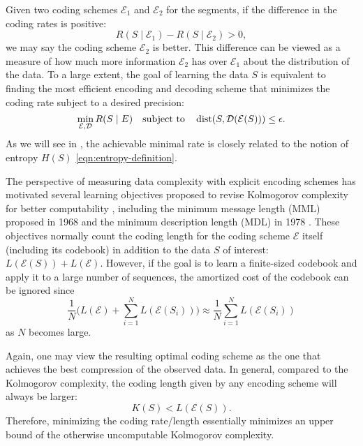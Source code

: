 \documentclass[../../book-main.tex]{subfiles}
\begin{document}
Given two coding schemes $\mathcal{E}_1$ and $\mathcal{E}_2$ for the segments, if the difference in the coding rates is positive:
\begin{equation}
   R(S \mid \mathcal E_1) -  R(S \mid \mathcal E_2) > 0, 
\end{equation}
we may say the coding scheme $\mathcal{E}_2$ is better. This difference can be viewed as a measure of how much more information $\mathcal{E}_2$ has over $\mathcal{E}_1$ about the distribution of the data. To a large extent, the goal of learning the data $S$ is equivalent to finding the most efficient encoding and decoding scheme that minimizes the coding rate subject to a desired precision:
\begin{equation}
   \min_{\mathcal{E}, \mathcal{D}} R(S \mid \mathcal \mathcal{E}) \quad \text{subject to} \quad \operatorname{dist}(S, \mathcal{D}(\mathcal{E}(S))) \leq \epsilon. 
\end{equation}
As we will see in , the achievable minimal rate is closely related to the notion of entropy $H(S)$ \eqref{eqn:entropy-definition}.


\begin{remark}\label{rem:computable-complexity}
    The perspective of measuring data complexity with explicit encoding schemes has motivated several learning objectives proposed to revise Kolmogorov complexity for better computability \cite{WallaceC1999}, including the minimum message length (MML) proposed in 1968 \cite{WallaceC1968} and the minimum description length (MDL) in 1978 \cite{Rissanen-1978,HansenM2001}. These objectives normally count the coding length for the coding scheme $\mathcal{E}$ itself (including its codebook) in addition to the data $S$ of interest: $L(\mathcal E(S)) + L(\mathcal E)$. However, if the goal is to learn a finite-sized codebook and apply it to a large number of sequences, the amortized cost of the codebook can be ignored since
    \begin{equation}
        \frac{1}{N}\Big( L(\mathcal{E}) + \sum_{i=1}^N L(\mathcal{E}(S_i))\Big) \approx \frac{1}{N}\sum_{i=1}^N L(\mathcal{E}(S_i))
    \end{equation}
    as $N$ becomes large.
\end{remark}

Again, one may view the resulting optimal coding scheme as the one that achieves the best compression of the observed data. In general, compared to the Kolmogorov complexity, the coding length given by any encoding scheme will always be larger:
\begin{equation}
    K(S) < L( \mathcal E(S)).
\end{equation}
Therefore, minimizing the coding rate/length essentially minimizes an upper bound of the otherwise uncomputable Kolmogorov complexity.
\end{document}
